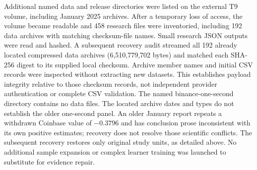 Additional named data and release directories were listed on the external T9 volume, including January 2025 archives. After a temporary loss of access, the volume became readable and 458 research files were inventoried, including 192 data archives with matching checksum-file names. Small research JSON outputs were read and hashed. A subsequent recovery audit streamed all 192 already located compressed data archives (6,510,779,702 bytes) and matched each SHA-256 digest to its supplied local checksum. Archive member names and initial CSV records were inspected without extracting new datasets. This establishes payload integrity relative to those checksum records, not independent provider authentication or complete CSV validation. The named binance-one-second directory contains no data files. The located archive dates and types do not establish the older one-second panel. An older January report repeats a withdrawn Coinbase value of $-0.3796$ and has conclusion prose inconsistent with its own positive estimates; recovery does not resolve those scientific conflicts. The subsequent recovery restores only original study units, as detailed above. No additional sample expansion or complex learner training was launched to substitute for evidence repair.

